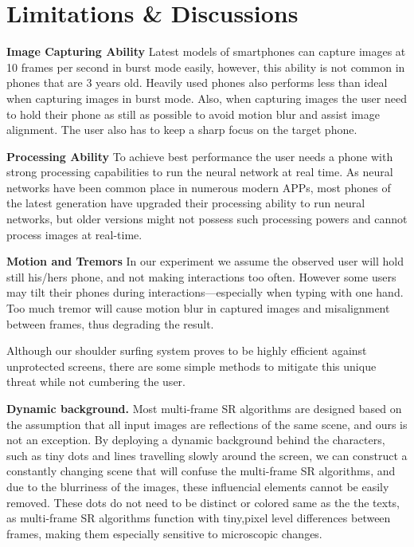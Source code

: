 \section{Limitations \& Discussions}
\label{sec-limitations-and-discussions}

\vspace{1mm}
\noindent
\textbf{Image Capturing Ability}
Latest models of smartphones can capture images at 10 frames per second in burst mode easily, however, this ability is not common in phones that are 3 years old. Heavily used phones also performs less than ideal when capturing images in burst mode. Also, when capturing images the user need to hold their phone as still as possible to avoid motion blur and assist image alignment. The user also has to keep a sharp focus on the target phone.

\vspace{1mm}
\noindent
\textbf{Processing Ability}
To achieve best performance the user needs a phone with strong processing capabilities to run the neural network at real time. As neural networks have been common place in numerous modern APPs, most phones of the latest generation have upgraded their processing ability to run neural networks, but older versions might not possess such processing powers and cannot process images at real-time.

\vspace{1mm}
\noindent
\textbf{Motion and Tremors}
In our experiment we assume the observed user will hold still his/hers phone, and not making interactions too often. However some users may tilt their phones during interactions—especially when typing with one hand. Too much tremor will cause motion blur in captured images and misalignment between frames, thus degrading the result.

Although our shoulder surfing system proves to be highly efficient against unprotected screens, there are some simple methods to mitigate this unique threat while not cumbering the user.

\vspace{1mm}
\noindent
\textbf{Dynamic background.} Most multi-frame SR algorithms are designed based on the assumption that all input images are reflections of the same scene, and ours is not an exception. By deploying a dynamic background behind the characters, such as tiny dots and lines travelling slowly around the screen, we can construct a constantly changing scene that will confuse the multi-frame SR algorithms, and due to the blurriness of the images, these influencial elements cannot be easily removed. These dots do not need to be distinct or colored same as the the texts, as multi-frame SR algorithms function with tiny,pixel level differences between frames, making them especially sensitive to microscopic changes.

